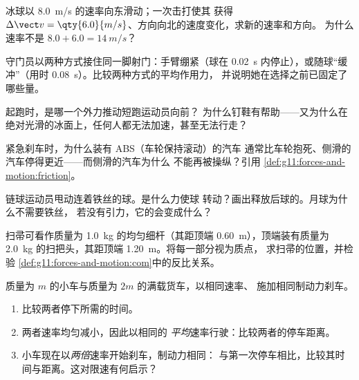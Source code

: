 \begin{exercise}[$\star\star$]\label{exo:g11:forces-and-motion:7}
冰球以 \qty{8.0}{m/s} 的速率向东滑动；一次击打使其
获得 $\Delta \vect v = \qty{6.0}{m/s}$、方向向北的速度变化，求新的速率和方向。
为什么速率不是 $8.0 + 6.0 = \qty{14}{m/s}$？
\end{exercise}

\begin{exercise}[$\star\star$]\label{exo:g11:forces-and-motion:8}
守门员以两种方式接住同一脚射门：手臂绷紧（球在
\qty{0.02}{s} 内停止），或随球“缓冲”（用时 \qty{0.08}{s}）。比较两种方式的平均作用力，
并说明她在选择之前已固定了哪些量。
\end{exercise}

\begin{exercise}[$\star\star$]\label{exo:g11:forces-and-motion:9}
起跑时，是哪一个外力推动短跑运动员向前？
为什么钉鞋有帮助——又为什么在
绝对光滑的冰面上，任何人都无法加速，甚至无法行走？
\end{exercise}

\begin{exercise}[$\star\star$]\label{exo:g11:forces-and-motion:10}
紧急刹车时，为什么装有 ABS（车轮保持滚动）的汽车
通常比车轮抱死、侧滑的汽车停得更近——而侧滑的汽车为什么
不能再被操纵？引用
\cref{def:g11:forces-and-motion:friction}。
\end{exercise}

\begin{exercise}[$\star\star$]\label{exo:g11:forces-and-motion:11}
链球运动员甩动连着铁丝的球。是什么力使球
转动？画出释放后球的。月球为什么不需要铁丝，
若没有引力，它的会变成什么？
\end{exercise}

\begin{exercise}[$\star\star\star$]\label{exo:g11:forces-and-motion:12}
扫帚可看作质量为 \qty{1.0}{kg} 的均匀细杆（其距顶端
\qty{0.60}{m}），顶端装有质量为 \qty{2.0}{kg} 的扫把头，其距顶端
\qty{1.20}{m}。将每一部分视为质点，
求扫帚的位置，并检验
\cref{def:g11:forces-and-motion:com}中的反比关系。
\end{exercise}

\begin{exercise}[$\star\star\star$]\label{exo:g11:forces-and-motion:13}
质量为 $m$ 的小车与质量为 $2m$ 的满载货车，以相同速率、
施加相同制动力刹车。
\begin{enumerate}
  \item 比较两者停下所需的时间。
  \item 两者速率均匀减小，因此以相同的
        \emph{平均}速率行驶：比较两者的停车距离。
  \item 小车现在以\emph{两倍}速率开始刹车，制动力相同：
        与第一次停车相比，比较其时间与距离。这对限速有何启示？
\end{enumerate}
\end{exercise}


